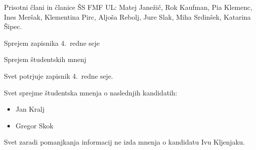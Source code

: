 \documentclass{seja}
\begin{document}
Prisotni člani in članice ŠS FMF UL:
Matej Janežič,
Rok Kaufman,
Pia Klemenc,
Ines Meršak,
Klementina Pirc,
Aljoša Rebolj,
Jure Slak,
Miha Srdinšek,
Katarina Šipec.

\begin{red*}
	\item Sprejem zapisnika 4.~redne seje
	\item Sprejem študentskih mnenj
\end{red*}

\begin{ad}
	\item
	\begin{sklep*}
		Svet potrjuje zapisnik 4.~redne seje.
	\end{sklep*}

	\item
	\begin{sklep*}
		Svet sprejme študentska mnenja o naslednjih kandidatih:
		\begin{itemize}
		    \item Jan Kralj
		    \item Gregor Skok
		\end{itemize}

		Svet zaradi pomanjkanja informacij ne izda mnenja o kandidatu Ivu Kljenjaku.
	\end{sklep*}
\end{ad}

\makeatletter \global\let\@enddocumenthook\@empty \makeatother
{}
\end{document}
